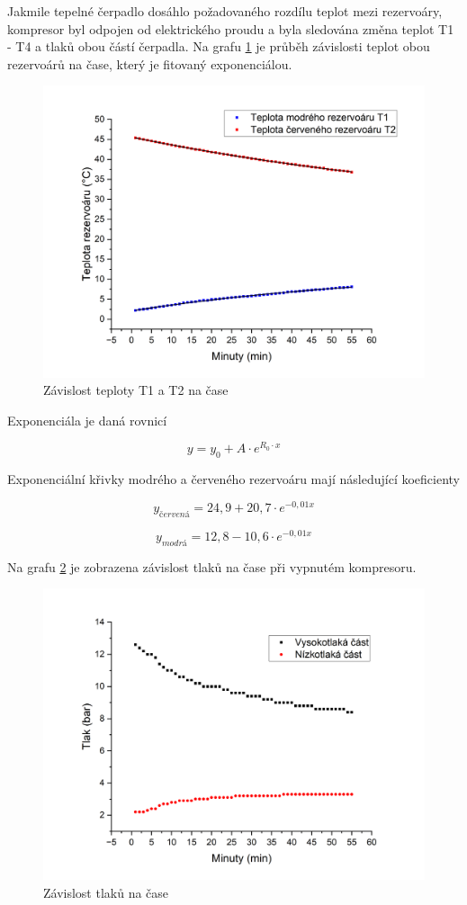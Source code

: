 Jakmile tepelné čerpadlo dosáhlo požadovaného rozdílu teplot mezi rezervoáry, kompresor byl odpojen od elektrického proudu a byla sledována změna teplot T1 - T4 a tlaků obou částí čerpadla. Na grafu \ref{fig:T1(t),T2(t)-vyp} je průběh závislosti teplot obou rezervoárů na čase, který je fitovaný exponenciálou.

\begin{figure}[h]
    \centering
    \includegraphics[width=0.68\linewidth]{27 - Tepelné čerpadlo//Protokol_tepelné čerpadlo//img/T1(t), T2(t) vyp.png}
    \caption{Závislost teploty T1 a T2 na čase}
    \label{fig:T1(t),T2(t)-vyp}
\end{figure}

Exponenciála je daná rovnicí

\begin{equation}
    \nonumber
    y = y_0 + A \cdot e^{R_0 \cdot x}
\end{equation}

Exponenciální křivky modrého a červeného rezervoáru mají následující koeficienty

\begin{equation}
    \nonumber
    y_{červená} = 24,9 + 20,7 \cdot e^{-0,01 x}
\end{equation}

\begin{equation}
    \nonumber
    y_{modrá} = 12,8 - 10,6 \cdot e^{-0,01 x}
\end{equation}

Na grafu \ref{fig:P(t)-vyp} je zobrazena závislost tlaků na čase při vypnutém kompresoru.

\begin{figure}[h]
    \centering
    \includegraphics[width=0.68\linewidth]{27 - Tepelné čerpadlo//Protokol_tepelné čerpadlo//img/P(t) vyp.png}
    \caption{Závislost tlaků na čase}
    \label{fig:P(t)-vyp}
\end{figure}

